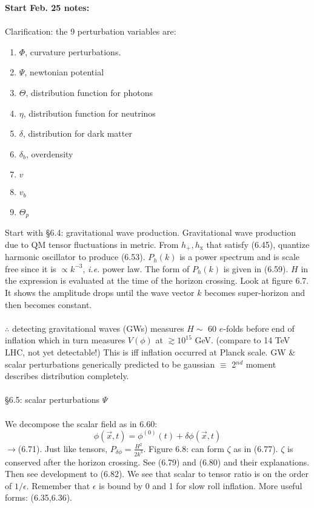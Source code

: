 \documentclass{article}
\begin{document}
\newpage
\textbf{Start Feb. 25 notes:}
\\ \\
Clarification: the 9 perturbation variables are: 
\begin{enumerate}
\item $\Phi$, curvature perturbations.
\item  $\Psi$, newtonian potential
\item $\Theta$, distribution function for photons
\item $\eta$, distribution function for neutrinos
\item $\delta$, distribution for dark matter
\item $\delta_b$, overdensity
\item $v$
\item $v_b$
\item $\Theta_p$ 
\end{enumerate}
Start with \S 6.4: gravitational wave production.  Gravitational wave production due to QM tensor fluctuations in metric.  From $h_+,h_\mathrm{x}$ that satisfy (6.45), quantize harmonic oscillator to produce (6.53).  $P_h(k)$ is a power spectrum and is scale free since it is $\propto k^{-3}$, \emph{i.e.} power law.  The form of $P_h(k)$ is given in (6.59).  $H$ in the expression is evaluated at the time of the horizon crossing.  Look at figure 6.7.  It shows the amplitude drops until the wave vector $k$ becomes super-horizon and then becomes constant.
\\ \\
$\therefore$ detecting gravitational waves (GWs) measures $H\sim$ 60 $e$-folds before end of inflation which in turn measures $V(\phi)$ at $\gtrsim 10^{15}$ GeV. (compare to 14 TeV LHC, not yet detectable!)  This is iff inflation occurred at Planck scale.  GW \& scalar perturbations generically predicted to be gaussian $\equiv$ 2$^{nd}$ moment describes distribution completely.
\\ \\
\S 6.5: scalar perturbations $\Psi$
\\ \\
We decompose the scalar field as in 6.60:
$$\phi(\vec{x},t) = \phi^{(0)}(t)+\delta\phi(\vec{x},t)$$
$\longrightarrow$(6.71).  Just like tensors, $P_{\delta\phi}=\frac{H^2}{2k^3}$.  Figure 6.8: can form $\zeta$ as in (6.77).  $\zeta$ is conserved after the horizon crossing.  See (6.79) and (6.80) and their explanations.  Then see development to (6.82).  We see that scalar to tensor ratio is on the order of $1/\epsilon$.  Remember that $\epsilon$ is bound by 0 and 1 for slow roll inflation.  More useful forms: (6.35,6.36).
\end{document}
